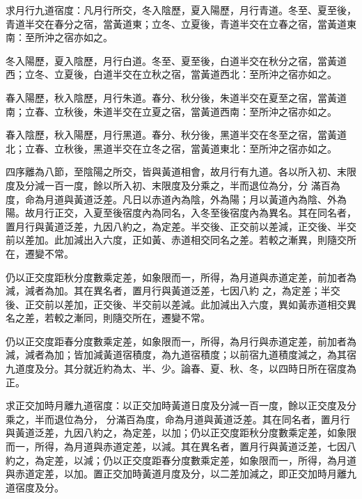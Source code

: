 \begin{pinyinscope}
 求月行九道宿度：凡月行所交，冬入陰歷，夏入陽歷，月行青道。冬至、夏至後，青道半交在春分之宿，當黃道東；立冬、立夏後，青道半交在立春之宿，當黃道東
 南：至所沖之宿亦如之。



 冬入陽歷，夏入陰歷，月行白道。冬至、夏至後，白道半交在秋分之宿，當黃道西；立冬、立夏後，白道半交在立秋之宿，當黃道西北：至所沖之宿亦如之。



 春入陽歷，秋入陰歷，月行朱道。春分、秋分後，朱道半交在夏至之宿，當黃道南；立春、立秋後，朱道半交在立夏之宿，當黃道西南：至所沖之宿亦如之。



 春入陰歷，秋入陽歷，月行黑道。春分、秋分後，黑道半交在冬至之宿，當黃道北；立春、立秋後，黑道半交在立冬之宿，當黃道東北：至所沖之宿亦如之。



 四序離為八節，至陰陽之所交，皆與黃道相會，故月行有九道。各以所入初、末限度及分減一百一度，餘以所入初、末限度及分乘之，半而退位為分，分
 滿百為度，命為月道與黃道泛差。凡日以赤道內為陰，外為陽；月以黃道內為陰、外為陽。故月行正交，入夏至後宿度內為同名，入冬至後宿度內為異名。其在同名者，置月行與黃道泛差，九因八約之，為定差。半交後、正交前以差減，正交後、半交前以差加。此加減出入六度，正如黃、赤道相交同名之差。若較之漸異，則隨交所在，遷變不常。



 仍以正交度距秋分度數乘定差，如象限而一，所得，為月道與赤道定差，前加者為減，減者為加。其在異名者，置月行與黃道泛差，七因八約
 之，為定差；半交後、正交前以差加，正交後、半交前以差減。此加減出入六度，異如黃赤道相交異名之差，若較之漸同，則隨交所在，遷變不常。



 仍以正交度距春分度數乘定差，如象限而一，所得，為月行與赤道定差，前加者為減，減者為加；皆加減黃道宿積度，為九道宿積度；以前宿九道積度減之，為其宿九道度及分。其分就近約為太、半、少。論春、夏、秋、冬，以四時日所在宿度為正。



 求正交加時月離九道宿度：以正交加時黃道日度及分減一百一度，餘以正交度及分乘之，半而退位為分，
 分滿百為度，命為月道與黃道泛差。其在同名者，置月行與黃道泛差，九因八約之，為定差，以加；仍以正交度距秋分度數乘定差，如象限而一，所得，為月道與赤道定差，以減。其在異名者，置月行與黃道泛差，七因八約之，為定差，以減；仍以正交度距春分度數乘定差，如象限而一，所得，為月道與赤道定差，以加。置正交加時黃道月度及分，以二差加減之，即正交加時月離九道宿度及分。




\end{pinyinscope}
